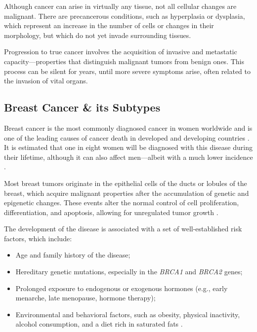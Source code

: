 Although cancer can arise in virtually any tissue, not all cellular changes are malignant. There are precancerous 
conditions, such as hyperplasia or dysplasia, which represent an increase in the number of cells or changes in their 
morphology, but which do not yet invade surrounding tissues.

Progression to true cancer involves the acquisition of invasive and metastatic capacity—properties that distinguish 
malignant tumors from benign ones. This process can be silent for years, until more severe symptoms arise, often related 
to the invasion of vital organs.

\subsection*{Breast Cancer \& its Subtypes}

Breast cancer is the most commonly diagnosed cancer in women worldwide and is one of the leading causes of cancer death 
in developed and developing countries \textcite{BreastEpidemiology_Romanowicz2022, updatedbca_Hong2022Breast}. It is estimated that one in eight women 
will be diagnosed with this disease during their lifetime, although it can also affect men—albeit with a much lower 
incidence \textcite{BreastEpidemiology_Romanowicz2022}.

Most breast tumors originate in the epithelial cells of the ducts or lobules of the breast, which acquire malignant 
properties after the accumulation of genetic and epigenetic changes. These events alter the normal control of cell 
proliferation, differentiation, and apoptosis, allowing for unregulated tumor growth \textcite{origins_and_evolution_bca_Polyak2007}.

The development of the disease is associated with a set of well-established risk factors, which include:
\begin{itemize}
    \item Age and family history of the disease;
    \item Hereditary genetic mutations, especially in the \textit{BRCA1} and \textit{BRCA2} genes;
    \item Prolonged exposure to endogenous or exogenous hormones (e.g., early menarche, late menopause, hormone therapy);
    \item Environmental and behavioral factors, such as obesity, physical inactivity, alcohol consumption, and a diet rich 
    in saturated fats \textcite{BreastEpidemiology_Romanowicz2022,clinical_implication_bca_Adamo2015}.
\end{itemize}

